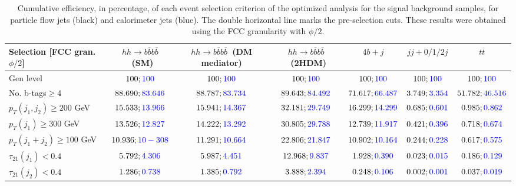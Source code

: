 \begin{landscape}
		\begin{table}
			\centering
			\caption{Cumulative efficiency, in percentage, of each event selection criterion of the optimized analysis for the signal background samples, for particle flow jets (black) and calorimeter jets (blue). The double horizontal line marks the pre-selection cuts. These results were obtained using the FCC granularity with $\phi/2$.}
			\begin{tabular}{lcccccc}
				\toprule 
				\textbf{Selection [FCC gran. $\phi/2$]} & $hh\rightarrow b\overline{b}b\overline{b}$~(SM) & $hh\rightarrow b\overline{b}b\overline{b}$~(DM mediator) & $hh\rightarrow b\overline{b}b\overline{b}$~(2HDM) & $4b+j$  & $jj+0/1/2 j$ & $t\overline{t}$ \\
				\midrule
				Gen level & $100;\textcolor{blue}{100}$ & $100;\textcolor{blue}{100}$ &$100;\textcolor{blue}{100}$& $100;\textcolor{blue}{100}$& $100;\textcolor{blue}{100}$& $100;\textcolor{blue}{100}$ \\
				\rowcolor{black!7}No. b-tags$\geq 4$&$88.690;\textcolor{blue}{83.646}$&$88.787;\textcolor{blue}{83.734}$&$89.643;\textcolor{blue}{84.492}$&$71.617;\textcolor{blue}{66.487}$&$3.749;\textcolor{blue}{3.354}$&$51.782;\textcolor{blue}{46.516}$\\
				$p_T(j_1,j_2)\geq200$ GeV & $15.533;\textcolor{blue}{13.966}$ & $15.941;\textcolor{blue}{14.367}$&$32.181;\textcolor{blue}{29.749}$ &$16.299;\textcolor{blue}{14.299}$&$0.685;\textcolor{blue}{0.601}$&$0.985;\textcolor{blue}{0.862}$\\ 
				\midrule \midrule
				\rowcolor{black!7}$p_T(j_1)\geq 300$ GeV & $13.526;\textcolor{blue}{12.827}$ &$14.222;\textcolor{blue}{13.292}$  &$30.805;\textcolor{blue}{29.788}$&$12.739;\textcolor{blue}{11.917}$&$0.421;\textcolor{blue}{0.396}$&$0.718;\textcolor{blue}{0.674}$\\ 
				$p_T(j_1+j_2)\geq 100$ GeV &$10.936;\textcolor{blue}{10-308}$ & $11.291;\textcolor{blue}{10.664}$ &$22.806;\textcolor{blue}{21.847}$&$10.902;\textcolor{blue}{10.164}$&$0.244;\textcolor{blue}{0.228}$&$0.617;\textcolor{blue}{0.575}$\\
				\rowcolor{black!7}$\tau_{21}(j_1)<0.4$ & $5.792;\textcolor{blue}{4.306}$& $5.987;\textcolor{blue}{4.451}$&$12.968;\textcolor{blue}{9.837}$&$1.928;\textcolor{blue}{0.390}$&$0.023;\textcolor{blue}{0.015}$&$0.186;\textcolor{blue}{0.129}$\\
				$\tau_{21}(j_2)<0.4$ &$1.286;\textcolor{blue}{0.738}$ &$1.385;\textcolor{blue}{0.792}$ &$3.888;\textcolor{blue}{2.394}$&$0.248;\textcolor{blue}{0.106}$&$0.002;\textcolor{blue}{0.001}$&$0.037;\textcolor{blue}{0.019}$\\

\end{tabular}
\end{table}
\end{landscape}

